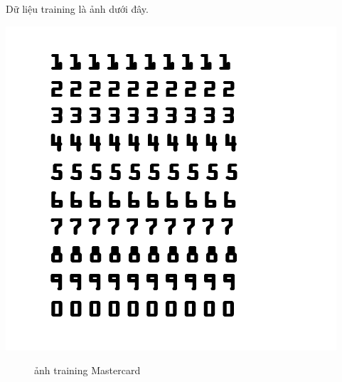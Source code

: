     \quad Dữ liệu training là ảnh dưới đây.
\begin{center}
    \includegraphics[scale = 1.2]{images/mastercard/training.png}
\end{center}
\begin{figure}[htp]
    \caption{ảnh training Mastercard}
\end{figure}



